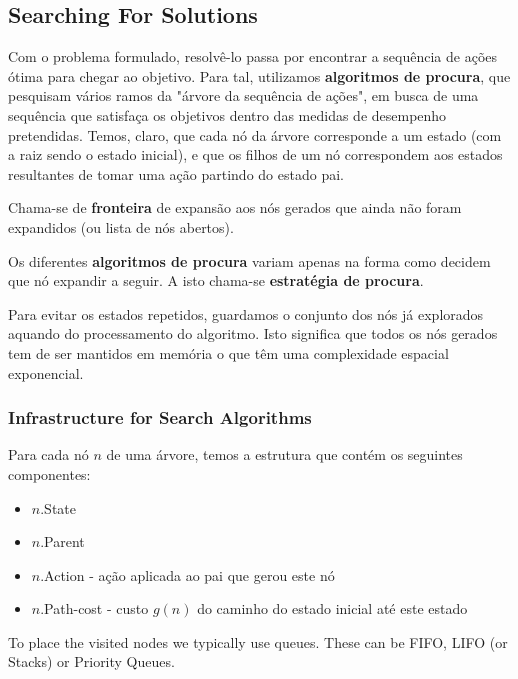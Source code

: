 \documentclass[11pt]{article}
\begin{document}
\subsection{Searching For Solutions}

Com o problema formulado, resolvê-lo passa por encontrar a sequência de ações ótima para chegar ao objetivo. Para tal, utilizamos \textbf{algoritmos de procura}, que pesquisam vários ramos da "árvore da sequência de ações", em busca de uma sequência que satisfaça os objetivos dentro das medidas de desempenho pretendidas. Temos, claro, que cada nó da árvore corresponde a um estado (com a raiz sendo o estado inicial), e que os filhos de um nó correspondem aos estados resultantes de tomar uma ação partindo do estado pai.\vspace{4pt}

Chama-se de \textbf{fronteira} de expansão aos nós gerados que ainda não foram expandidos (ou lista de nós abertos).\vspace{4pt}

Os diferentes \textbf{algoritmos de procura} variam apenas na forma como decidem que nó expandir a seguir. A isto chama-se \textbf{estratégia de procura}.\vspace{4pt}

Para evitar os estados repetidos, guardamos o conjunto dos nós já explorados aquando do processamento do algoritmo. Isto significa que todos os nós gerados tem de ser mantidos em memória o que têm uma complexidade espacial exponencial.\vspace{4pt}

\subsubsection{Infrastructure for Search Algorithms}

Para cada nó $n$ de uma árvore, temos a estrutura que contém os seguintes componentes:
\begin{itemize}[topsep=4pt,itemsep=0pt]
    \item $n$.State
    \item $n$.Parent
    \item $n$.Action - ação aplicada ao pai que gerou este nó
    \item $n$.Path-cost - custo $g(n)$ do caminho do estado inicial até este estado
\end{itemize}
To place the visited nodes we typically use queues. These can be FIFO, LIFO (or Stacks) or Priority Queues.
\end{document}
